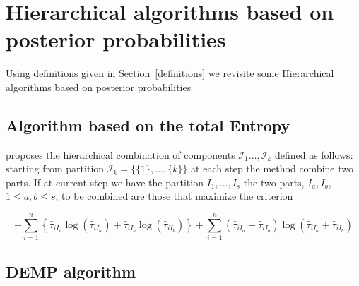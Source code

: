 \documentclass[10pt, a4paper]{article}
\newcommand{\m}[1]{\boldsymbol{#1}}
\begin{document}
%

\section{Hierarchical algorithms based on posterior probabilities}

Using definitions given in Section~\ref{definitions} we revisite some Hierarchical algorithms based on posterior probabilities

\subsection*{Algorithm based on the total Entropy}


\cite{baudry2010combining} proposes the  hierarchical combination of components  $\mathcal{I}_1 \dots, \mathcal{I}_k$ defined as follows: starting from partition $\mathcal{I}_k = \{\{1\},\dots, \{k\}\}$ at each step the method combine two parts. If at current step we have the partition  $I_1, \dots, I_s$ the two parts, $I_a, I_b$, $1 \leq a,b \leq s$, to be combined are those that maximize the criterion

\[
- \sum_{i=1}^n \left\{ \hat{\tau}_{iI_a} \log(\hat{\tau}_{iI_a}) + \hat{\tau}_{iI_b} \log(\hat{\tau}_{iI_b})\right\} +  \sum_{i=1}^n  (\hat{\tau}_{iI_a}+\hat{\tau}_{iI_b}) \log(\hat{\tau}_{iI_a} + \hat{\tau}_{iI_b})
\]


\subsection*{DEMP algorithm}

\end{document}
